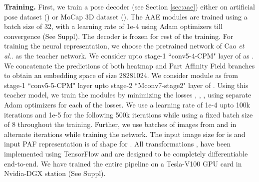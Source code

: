 \documentclass[runningheads]{llncs}
\makeatletter
\DeclareRobustCommand\onedot{\futurelet\@let@token\@onedot}
\def\@onedot{\ifx\@let@token.\else.\null\fi\xspace}
\def\etal{\emph{et al}\onedot}
\makeatother
\begin{document}
\textbf{Training.} First, we train a pose decoder (see Section \ref{sec:aae}) either on artificial pose dataset () or MoCap 3D dataset (). The AAE modules are trained using a batch size of 32, with a learning rate of 1e-4 using Adam optimizers till convergence (See Suppl). The decoder  is frozen for rest of the training. For training the neural representation, we choose the pretrained network of Cao \etal \cite{cao2017realtime} as the teacher network. We consider upto stage-1 ``conv5-4-CPM" layer of \cite{cao2017realtime} as . We concatenate the predictions of both heatmap and Part Affinity Field branches to obtain an embedding space of size 28281024. We consider module  as from stage-1 ``conv5-5-CPM" layer upto stage-2 ``Mconv7-stage2" layer of \cite{cao2017realtime}. 
Using this teacher model, we train the modules  by minimizing the losses , , ,  using separate Adam optimizers for each of the losses. We use a learning rate of 1e-4 upto 100k iterations and 1e-5 for the following 500k iterations while using a fixed batch size of 8 throughout the training. Further, we use batches of images from  and   in alternate iterations while training the network. The input image size for  is  and input PAF representation \cite{cao2017realtime} is of shape  for . All transformations ,  have been implemented using TensorFlow and are designed to be completely differentiable end-to-end. We have trained the entire pipeline on a Tesla-V100 GPU card in Nvidia-DGX station (See Suppl).
\end{document}
